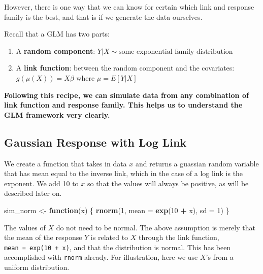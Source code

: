 \documentclass[
  openany]{book}
\newenvironment{Shaded}{\begin{snugshade}}{\end{snugshade}}
\newcommand{\ControlFlowTok}[1]{\textcolor[rgb]{0.13,0.29,0.53}{\textbf{#1}}}
\newcommand{\DataTypeTok}[1]{\textcolor[rgb]{0.13,0.29,0.53}{#1}}
\newcommand{\DecValTok}[1]{\textcolor[rgb]{0.00,0.00,0.81}{#1}}
\newcommand{\KeywordTok}[1]{\textcolor[rgb]{0.13,0.29,0.53}{\textbf{#1}}}
\newcommand{\NormalTok}[1]{#1}
\newcommand{\OperatorTok}[1]{\textcolor[rgb]{0.81,0.36,0.00}{\textbf{#1}}}
\newcommand{\StringTok}[1]{\textcolor[rgb]{0.31,0.60,0.02}{#1}}
\begin{document}
However, there is one way that we can know for certain which link and response family is the best, and that is if we generate the data ourselves.

Recall that a GLM has two parts:

\begin{enumerate}
\def\labelenumi{\arabic{enumi}.}
\item
  A \textbf{random component}: \(Y|X \sim \text{some exponential family distribution}\)
\item
  A \textbf{link function}: between the random component and the covariates: \(g(\mu(X)) = X\beta\) where \(\mu = E[Y|X]\)
\end{enumerate}

\textbf{Following this recipe, we can simulate data from any combination of link function and response family. This helps us to understand the GLM framework very clearly.}

\hypertarget{gaussian-response-with-log-link}{%
\subsection{Gaussian Response with Log Link}\label{gaussian-response-with-log-link}}

We create a function that takes in data \(x\) and returns a guassian random variable that has mean equal to the inverse link, which in the case of a log link is the exponent. We add 10 to \(x\) so that the values will always be positive, as will be described later on.

\begin{Shaded}
\begin{Highlighting}[]
\NormalTok{sim_norm <-}\StringTok{ }\ControlFlowTok{function}\NormalTok{(x) \{}
  \KeywordTok{rnorm}\NormalTok{(}\DecValTok{1}\NormalTok{, }\DataTypeTok{mean =} \KeywordTok{exp}\NormalTok{(}\DecValTok{10} \OperatorTok{+}\StringTok{ }\NormalTok{x), }\DataTypeTok{sd =} \DecValTok{1}\NormalTok{)}
\NormalTok{\}}
\end{Highlighting}
\end{Shaded}

The values of \(X\) do not need to be normal. The above assumption is merely that the mean of the response \(Y\) is related to \(X\) through the link function, \texttt{mean\ =\ exp(10\ +\ x)}, and that the distribution is normal. This has been accomplished with \texttt{rnorm} already. For illustration, here we use \(X\)'s from a uniform distribution.

\begin{Shaded}
\end{Shaded}
\end{document}
